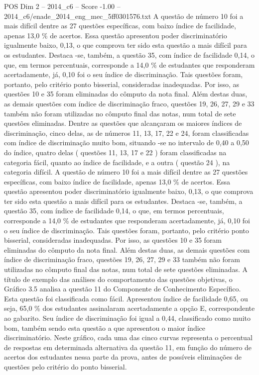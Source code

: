 \begin{textsample}{POS Dim 2 – 2014\_c6 – Score -1.00 – 2014\_c6/enade\_2014\_eng\_mec\_5ff0301576.txt}
A questão de número 10 foi a mais difícil dentre as 27 questões específicas, com baixo índice de facilidade, apenas 13,0 \% de acertos.
Essa questão apresentou poder discriminatório igualmente baixo, 0,13, o que comprova ter sido esta questão a mais difícil para os estudantes.
Destaca -se, também, a questão 35, com índice de facilidade 0,14, o que, em termos percentuais, corresponde a 14,0 \% de estudantes que responderam acertadamente, já, 0,10 foi o seu índice de discriminação.
Tais questões foram, portanto, pelo critério ponto bisserial, consideradas inadequadas.
Por isso, as questões 10 e 35 foram eliminadas do cômputo da nota final.
Além destas duas, as demais questões com índice de discriminação fraco, questões 19, 26, 27, 29 e 33 também não foram utilizadas no cômputo final das notas, num total de sete questões eliminadas.
Dentre as questões que alcançaram os maiores índices de discriminação, cinco delas, as de números 11, 13, 17, 22 e 24, foram classificadas com índice de discriminação muito bom, situando -se no intervalo de 0,40 a 0,50 do índice, quatro delas ( questões 11, 13, 17 e 22 ) foram classificadas na categoria fácil, quanto ao índice de facilidade, e a outra ( questão 24 ), na categoria difícil.
A questão de número 10 foi a mais difícil dentre as 27 questões específicas, com baixo índice de facilidade, apenas 13,0 \% de acertos.
Essa questão apresentou poder discriminatório igualmente baixo, 0,13, o que comprova ter sido esta questão a mais difícil para os estudantes.
Destaca -se, também, a questão 35, com índice de facilidade 0,14, o que, em termos percentuais, corresponde a 14,0 \% de estudantes que responderam acertadamente, já, 0,10 foi o seu índice de discriminação.
Tais questões foram, portanto, pelo critério ponto bisserial, consideradas inadequadas.
Por isso, as questões 10 e 35 foram eliminadas do cômputo da nota final.
Além destas duas, as demais questões com índice de discriminação fraco, questões 19, 26, 27, 29 e 33 também não foram utilizadas no cômputo final das notas, num total de sete questões eliminadas.
A título de exemplo das análises do comportamento das questões objetivas, o Gráfico 3.5 analisa a questão 11 do Componente de Conhecimento Específico.
Esta questão foi classificada como fácil.
Apresentou índice de facilidade 0,65, ou seja, 65,0 \% dos estudantes assinalaram acertadamente a opção E, correspondente ao gabarito.
Seu índice de discriminação foi igual a 0,44, classificado como muito bom, também sendo esta questão a que apresentou o maior índice discriminatório.
Neste gráfico, cada uma das cinco curvas representa o percentual de respostas em determinada alternativa da questão 11, em função do número de acertos dos estudantes nessa parte da prova, antes de possíveis eliminações de questões pelo critério do ponto bisserial.

\end{textsample}
